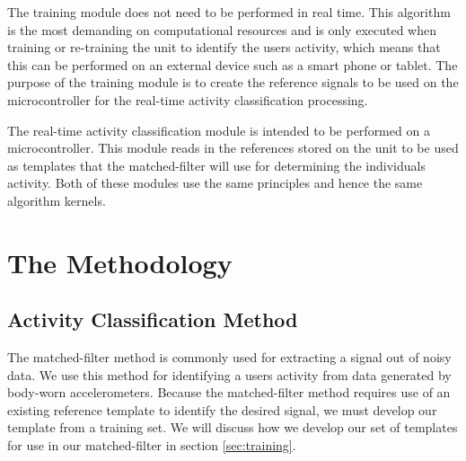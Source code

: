 \documentclass[journal]{IEEEtran}
\begin{document}
The training module does not need to be performed in real time.
This algorithm is the most demanding on computational resources and is only executed when training or re-training the unit to identify the user\textquotesingle s activity, which means that this can be performed on an external device such as a smart phone or tablet.
The purpose of the training module is to create the reference signals to be used on the microcontroller for the real-time activity classification processing.

The real-time activity classification module is intended to be performed on a microcontroller.
This module reads in the references stored on the unit to be used as templates that the matched-filter will use for determining the individual\textquotesingle s activity.
Both of these modules use the same principles and hence the same algorithm kernels.
%
\section{The Methodology}
%
\subsection{Activity Classification Method}
The matched-filter method is commonly used for extracting a signal out of noisy data.
We use this method for identifying a user\textquotesingle s activity from data generated by body-worn accelerometers.
Because the matched-filter method requires use of an existing reference template to identify the desired signal, we must develop our template from a training set.
We will discuss how we develop our set of templates for use in our matched-filter in section \ref{sec:training}.
\end{document}
